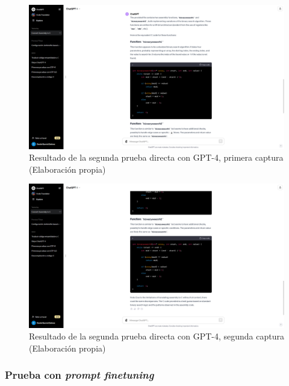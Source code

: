 \begin{figure}[H]
    \begin{center}
      \includegraphics[scale=0.3]{figuras/Capitulo_12/ResultadoDirectoGPT4_V2_1.png}
    \end{center}
    \caption[Resultado de la segunda prueba directa con GPT-4, primera captura]{Resultado de la segunda prueba directa con GPT-4, primera captura (Elaboración propia)}
    \label{fig:resultado_gpt4_directo_V2_1}
\end{figure}

\begin{figure}[H]
    \begin{center}
      \includegraphics[scale=0.3]{figuras/Capitulo_12/ResultadoDirectoGPT4_V2_2.png}
    \end{center}
    \caption[Resultado de la segunda prueba directa con GPT-4, segunda captura]{Resultado de la segunda prueba directa con GPT-4, segunda captura (Elaboración propia)}
    \label{fig:resultado_gpt4_directo_V2_2}
\end{figure}

\subsubsection{Prueba con \textit{prompt finetuning}}
\label{subsubsec:prueba_prompt_finetuning}

